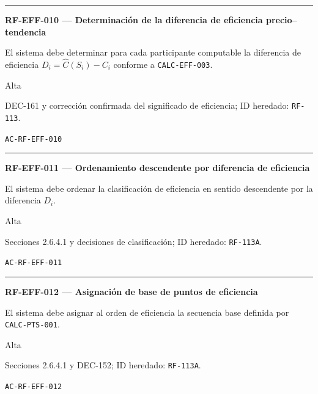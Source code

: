\documentclass[10pt,letterpaper]{article}
\begin{document}
\vspace{0.25em}\hrule\vspace{0.65em}
\noindent\textbf{RF-EFF-010 --- Determinación de la diferencia de eficiencia precio--tendencia}\par
\begin{description}[style=nextline,leftmargin=3.15cm,labelwidth=2.8cm,font=\normalfont\bfseries]
\item[Obligación] El sistema debe determinar para cada participante computable la diferencia de eficiencia $D_i=\widehat{C}(S_i)-C_i$ conforme a \texttt{CALC-EFF-003}.
\item[Prioridad] Alta
\item[Procedencia] DEC-161 y corrección confirmada del significado de eficiencia; ID heredado: \texttt{RF-113}.
\item[Verificación] \texttt{AC-RF-EFF-010}
\end{description}
\vspace{0.25em}\hrule\vspace{0.65em}
\noindent\textbf{RF-EFF-011 --- Ordenamiento descendente por diferencia de eficiencia}\par
\begin{description}[style=nextline,leftmargin=3.15cm,labelwidth=2.8cm,font=\normalfont\bfseries]
\item[Obligación] El sistema debe ordenar la clasificación de eficiencia en sentido descendente por la diferencia $D_i$.
\item[Prioridad] Alta
\item[Procedencia] Secciones 2.6.4.1 y decisiones de clasificación; ID heredado: \texttt{RF-113A}.
\item[Verificación] \texttt{AC-RF-EFF-011}
\end{description}
\vspace{0.25em}\hrule\vspace{0.65em}
\noindent\textbf{RF-EFF-012 --- Asignación de base de puntos de eficiencia}\par
\begin{description}[style=nextline,leftmargin=3.15cm,labelwidth=2.8cm,font=\normalfont\bfseries]
\item[Obligación] El sistema debe asignar al orden de eficiencia la secuencia base definida por \texttt{CALC-PTS-001}.
\item[Prioridad] Alta
\item[Procedencia] Secciones 2.6.4.1 y DEC-152; ID heredado: \texttt{RF-113A}.
\item[Verificación] \texttt{AC-RF-EFF-012}
\end{description}
\end{document}
